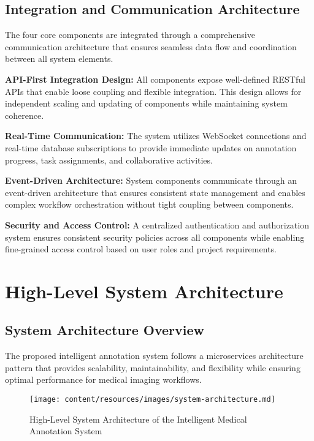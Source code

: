 \subsection{Integration and Communication Architecture}

The four core components are integrated through a comprehensive communication architecture that ensures seamless data flow and coordination between all system elements.

\textbf{API-First Integration Design:} All components expose well-defined RESTful APIs that enable loose coupling and flexible integration. This design allows for independent scaling and updating of components while maintaining system coherence.

\textbf{Real-Time Communication:} The system utilizes WebSocket connections and real-time database subscriptions to provide immediate updates on annotation progress, task assignments, and collaborative activities.

\textbf{Event-Driven Architecture:} System components communicate through an event-driven architecture that ensures consistent state management and enables complex workflow orchestration without tight coupling between components.

\textbf{Security and Access Control:} A centralized authentication and authorization system ensures consistent security policies across all components while enabling fine-grained access control based on user roles and project requirements.

\section{High-Level System Architecture}

\subsection{System Architecture Overview}

The proposed intelligent annotation system follows a microservices architecture pattern that provides scalability, maintainability, and flexibility while ensuring optimal performance for medical imaging workflows.

\begin{figure}[htbp]
    \centering
    \texttt{[image: content/resources/images/system-architecture.md]}
    \caption{High-Level System Architecture of the Intelligent Medical Annotation System}
    \label{fig:high-level-architecture}
\end{figure}

